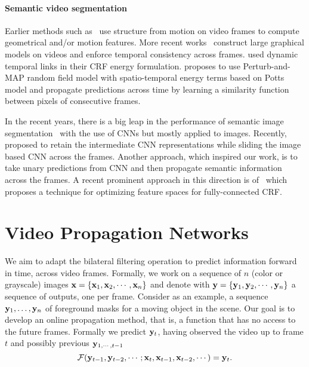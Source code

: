 \vspace{-0.3cm}
\paragraph{Semantic video segmentation}
Earlier methods such as~\cite{brostow2008segmentation,sturgess2009combining} use structure from motion
on video frames to compute geometrical and/or motion features.
More recent works~\cite{ess2009segmentation,chen2011temporally,de2012line,miksik2013efficient,tripathi2015semantic,
kundu2016feature} construct large graphical models on videos and enforce temporal consistency across frames. \cite{chen2011temporally} used dynamic temporal links in their CRF energy formulation.
\cite{de2012line} proposes to use Perturb-and-MAP random field model with spatio-temporal energy terms
based on Potts model and \cite{miksik2013efficient} propagate predictions across time by learning
a similarity function between pixels of consecutive frames.

In the recent years, there is a big leap in the performance of semantic image
segmentation~\cite{long2014fully,chen2014semantic} with the use of CNNs but mostly
applied to images. Recently,~\cite{shelhamer2016clockwork}
proposed to retain the intermediate CNN representations while sliding the image based
CNN across the frames. Another approach, which inspired our work, is to take unary
predictions from CNN and then propagate semantic information across the frames. A recent
prominent approach in this direction is of~\cite{kundu2016feature} which proposes
a technique for optimizing feature spaces for fully-connected CRF.

\section{Video Propagation Networks}
\label{sec:vpn}

We aim to adapt the bilateral filtering operation to predict information forward in time, across video frames.
Formally, we work on a sequence of $n$ (color or grayscale) images $\mathbf{x} = \{\mathbf{x}_1, \mathbf{x}_2, \cdots, \mathbf{x}_n\}$
and denote with $\mathbf{y} = \{\mathbf{y}_1, \mathbf{y}_2, \cdots, \mathbf{y}_n\}$ a sequence of outputs, one per frame.
Consider as an example, a sequence $\mathbf{y}_1,\ldots,\mathbf{y}_n$ of foreground masks for a moving object in the
scene. Our goal is to develop an online propagation method, that is, a function that has no access to the future frames.
Formally we predict $\mathbf{y}_t$, having observed the video up to frame $t$ and possibly previous $\mathbf{y}_{1,\cdots,t-1}$
\begin{equation}
\mathcal{F}(\mathbf{y}_{t-1}, \mathbf{y}_{t-2}, \cdots; \mathbf{x}_t, \mathbf{x}_{t-1}, \mathbf{x}_{t-2},\cdots) = \mathbf{y}_t.
\end{equation}

